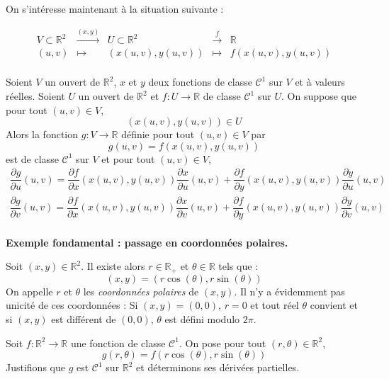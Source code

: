 \documentclass[a4paper,10pt]{report}
\begin{document}
\noindent On s'intéresse maintenant à la situation suivante : 

$$ \begin{array}{ccccccc}
V \subset \mathbb{R}^2 & \overset{(x,y)}{\rightarrow} & U \subset \mathbb{R}^2 & \overset{f}{\rightarrow} & \mathbb{R} \\
(u,v) & \mapsto & (x(u,v),y(u,v)) & \mapsto & f(x(u,v),y(u,v)) \\
\end{array}$$

\begin{prop} Soient $V$ un ouvert de $\mathbb{R}^2$, $x$ et $y$ deux fonctions de classe $\mathcal{C}^1$ sur $V$ et à valeurs réelles. Soient $U$ un ouvert de $\mathbb{R}^2$ et $f : U \rightarrow \mathbb{R}$ de classe $\mathcal{C}^1$ sur $U$. On suppose que pour tout $(u,v) \in V$,
$$ (x(u,v),y(u,v)) \in U$$
Alors la fonction $g : V \rightarrow \mathbb{R}$ définie pour tout $(u,v) \in V$ par 
$$ g(u,v) = f(x(u,v),y(u,v))$$
est de classe $\mathcal{C}^1$ sur $V$ et pour tout $(u,v) \in V$,
\begin{align*}
\dfrac{\partial g}{\partial u} (u,v) = \dfrac{\partial f}{\partial x}(x(u,v),y(u,v)) \dfrac{\partial x}{\partial u}(u,v) + \dfrac{\partial f}{\partial y}(x(u,v),y(u,v)) \dfrac{\partial y}{\partial u}(u,v) \\
\dfrac{\partial g}{\partial v} (u,v) = \dfrac{\partial f}{\partial x}(x(u,v),y(u,v)) \dfrac{\partial x}{\partial v}(u,v) + \dfrac{\partial f}{\partial y}(x(u,v),y(u,v)) \dfrac{\partial y}{\partial v}(u,v) \\
\end{align*}
\end{prop}

\noindent \textbf{Exemple fondamental : passage en coordonnées polaires.}

\noindent Soit $(x,y) \in \mathbb{R}^2$. Il existe alors $r \in \mathbb{R}_+$ et $\theta \in \mathbb{R}$ tels que :
$$ (x,y) = (r \cos(\theta), r \sin(\theta))$$
On appelle $r$ et $\theta$ les \textit{coordonnées polaires} de $(x,y)$. Il n'y a évidemment pas unicité de ces coordonnées : Si $(x,y)=(0,0)$, $r=0$ et tout réel $\theta$ convient et si $(x,y)$ est différent de $(0,0)$, $\theta$ est \og défini \fg modulo $2\pi$. 

\medskip

\noindent Soit $f : \mathbb{R}^2 \rightarrow \mathbb{R}$ une fonction de classe $\mathcal{C}^1$. On pose pour tout $(r, \theta) \in \mathbb{R}^2$,
$$ g(r, \theta)= f(r \cos(\theta), r \sin(\theta))$$
Justifions que $g$ est $\mathcal{C}^1$ sur $\mathbb{R}^2$ et déterminons ses dérivées partielles.
\end{document}

